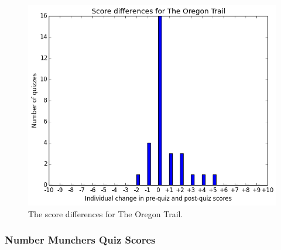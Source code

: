 			\begin{figure}[h] 
			\centering 
			\includegraphics[height=0.33\textheight]{oregon_results.png} 
			\caption{The score differences for The Oregon Trail.}
			\end{figure}

	\cleardoublepage

		\subsubsection{Number Munchers Quiz Scores}

			

